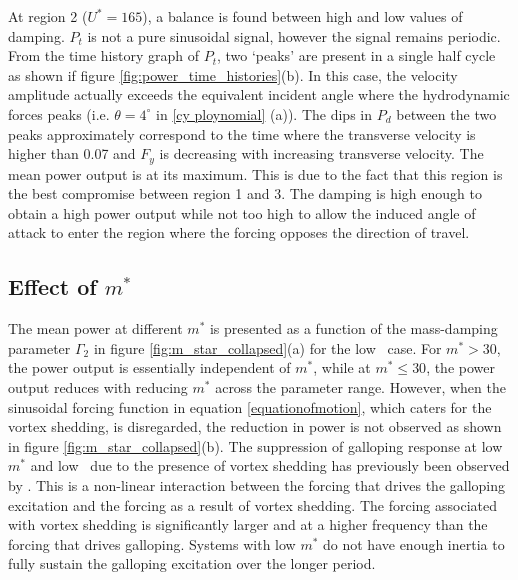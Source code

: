 At region 2 ($U^*=165$), a balance is found between high and low values of damping. $P_t$ is not a pure sinusoidal signal, however the signal remains periodic. From the time history graph of $P_t$, two `peaks' are present in a single half cycle as shown if figure \ref{fig:power_time_histories}(b). In this case, the velocity amplitude actually exceeds the equivalent incident angle where the hydrodynamic forces peaks (i.e. $\theta=4^\circ$ in \ref{cy ploynomial} (a)). The dips in $P_d$ between the two peaks approximately correspond to the time where the transverse velocity is higher than 0.07 and $F_y$ is decreasing with increasing transverse velocity. The mean power output is at its maximum. This is due to the fact that this region is the best compromise between region 1 and 3. The damping is high enough to obtain a high power output while not too high to allow the induced angle of attack to enter the region where the forcing opposes the direction of travel. 

  



\subsection{Effect of $m^*$}

 
 

The mean power at different $m^*$ is presented as a function of the mass-damping parameter $\Gamma_2$ in figure \ref{fig:m_star_collapsed}(a) for the low \reynoldsnumber\ case. For $m^*>30$, the power output is essentially independent of $m^*$, while at $m^* \leq 30$, the power output reduces with reducing $m^*$ across the parameter range. However, when the sinusoidal forcing function in equation \ref{equationofmotion}, which caters for the vortex shedding, is disregarded, the reduction in power is not observed as shown in figure \ref{fig:m_star_collapsed}(b). The suppression of galloping response at low $m^*$ and low \reynoldsnumber\ due to the presence of vortex shedding has previously been observed by \cite{Joly2012}. This is a non-linear interaction between the forcing that drives the galloping excitation and the forcing as a result of vortex shedding. The forcing associated with vortex  shedding is significantly larger and at a higher frequency than the forcing that drives galloping. Systems with low $m^*$ do not have enough inertia to fully sustain the galloping excitation over the longer period.

